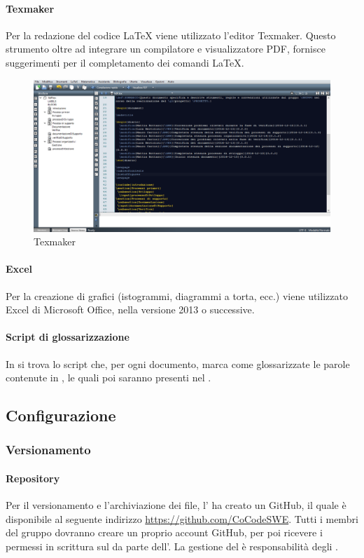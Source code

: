  \paragraph{Texmaker}
Per la redazione del codice \LaTeX{}{} viene utilizzato l'editor Texmaker. Questo
strumento oltre ad integrare un compilatore e visualizzatore PDF, fornisce suggerimenti per il completamento dei comandi \LaTeX{}.
\begin{figure}[h]
\centering

\includegraphics[scale=0.4]{img/texm.png}
\caption{Texmaker}\label{sec:Figura3}
\end{figure}
 \paragraph{Excel}
Per la creazione di grafici (istogrammi, diagrammi a torta, ecc.) viene utilizzato Excel di Microsoft Office, nella versione 2013 o successive.
\paragraph{Script di glossarizzazione}

In \GloScript{} si trova lo script che, per ogni documento, marca come glossarizzate le parole contenute in , le quali poi saranno presenti nel \Gldoc.

\subsection{Configurazione}
\subsubsection{Versionamento}
\paragraph{Repository}
Per il versionamento e l'archiviazione dei file, l'\AMM{} ha creato un  GitHub, il quale è disponibile al seguente indirizzo \url{https://github.com/CoCodeSWE}. Tutti i membri del gruppo dovranno creare un proprio account GitHub, per poi ricevere i permessi in scrittura sul  da parte dell'\AMM.
La gestione del  è responsabilità degli \AMMP.
